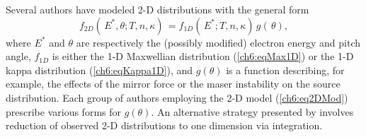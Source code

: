   Several authors \citep{Maggs1981,Bingham1999,Bingham2000,Mutel2007} have
  modeled 2-D distributions with the general form
    \begin{equation} \label{ch6:eq2DMod} f_{2D}(\, E^*, \theta ; T, n,
      \kappa) \, = f_{1D}(\, E^*; T, n, \kappa) \, g(\, \theta),
    \end{equation}
  where $E^*$ and $\theta$ are respectively the (possibly modified) electron
  energy and pitch angle, $f_{1D}$ is either the 1-D Maxwellian distribution
  (\ref{ch6:eqMax1D}) or the 1-D kappa distribution (\ref{ch6:eqKappa1D}), and
  $g(\theta )$ is a function describing, for example, the effects of the mirror
  force or the maser instability on the source distribution. Each group of
  authors employing the 2-D model (\ref{ch6:eq2DMod}) prescribe various forms
  for $g(\theta)$. An alternative strategy presented by \citet{Pritchett1999}
  involves reduction of observed 2-D distributions to one dimension via
  integration.


